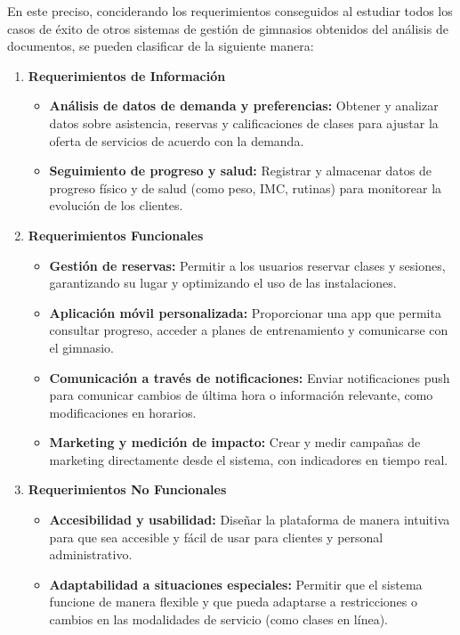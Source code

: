 En este preciso, conciderando los requerimientos conseguidos al estudiar todos los casos de éxito de otros sistemas de gestión de gimnasios obtenidos del análisis de documentos, se pueden clasificar de la siguiente manera:

\begin{enumerate}
    \item \textbf{Requerimientos de Información}
    \begin{itemize}
        \item \textbf{Análisis de datos de demanda y preferencias:} Obtener y analizar datos sobre asistencia, reservas y calificaciones de clases para ajustar la oferta de servicios de acuerdo con la demanda.
        \item \textbf{Seguimiento de progreso y salud:} Registrar y almacenar datos de progreso físico y de salud (como peso, IMC, rutinas) para monitorear la evolución de los clientes.
    \end{itemize}
    \item \textbf{Requerimientos Funcionales}
    \begin{itemize}
        \item \textbf{Gestión de reservas:} Permitir a los usuarios reservar clases y sesiones, garantizando su lugar y optimizando el uso de las instalaciones.
        \item \textbf{Aplicación móvil personalizada:} Proporcionar una app que permita consultar progreso, acceder a planes de entrenamiento y comunicarse con el gimnasio.
        \item \textbf{Comunicación a través de notificaciones:} Enviar notificaciones push para comunicar cambios de última hora o información relevante, como modificaciones en horarios.
        \item \textbf{Marketing y medición de impacto:} Crear y medir campañas de marketing directamente desde el sistema, con indicadores en tiempo real.
    \end{itemize}
    \item \textbf{Requerimientos No Funcionales}
    \begin{itemize}
        \item \textbf{Accesibilidad y usabilidad:} Diseñar la plataforma de manera intuitiva para que sea accesible y fácil de usar para clientes y personal administrativo.
        \item \textbf{Adaptabilidad a situaciones especiales:} Permitir que el sistema funcione de manera flexible y que pueda adaptarse a restricciones o cambios en las modalidades de servicio (como clases en línea).

\end{itemize}
\end{enumerate}
